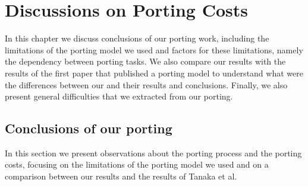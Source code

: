 \chapter{Discussions on Porting Costs} \label{sec:discussion}


%

In this chapter we discuss conclusions of our porting work, including the
limitations of the porting model we used and factors for these limitations,
namely the dependency between porting tasks. We also compare our results with
the results of the first paper that published a porting model to understand what
were the differences between our and their results and conclusions. Finally, we
also present general difficulties that we extracted from our porting.

\section{Conclusions of our porting}

In this section we present observations about the porting process and the
porting costs, focusing on the limitations of the porting model we used and on a
comparison between our results and the results of Tanaka et al.

